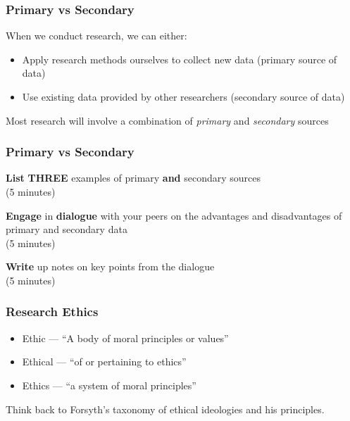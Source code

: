 \begin{frame}
	\frametitle{Primary vs Secondary}
	
	When we conduct research, we can either:
	
	\begin{itemize}
		\item Apply research methods ourselves to collect new data (primary source of data)
		\item Use existing data provided by other researchers (secondary source of data)
	\end{itemize}
	
	Most research will involve a combination of \textit{primary} and \textit{secondary} sources
	
\end{frame}

\begin{frame}
	\frametitle{Primary vs Secondary}
	
	\textbf{List} \textbf{THREE} examples of primary \textbf{and} secondary sources \\
	(5 minutes)
	
	\vspace{2em}
	
	\textbf{Engage} in \textbf{dialogue} with your peers on the advantages and disadvantages of primary and secondary data \\
	(5 minutes)
	
	\vspace{2em}
	
	\textbf{Write} up notes on key points from the dialogue \\
	(5 minutes)
\end{frame}

\begin{frame}
	\frametitle{Research Ethics}
	
	\begin{itemize}
		\item Ethic --- ``A body of moral principles or values''
		\item Ethical --- ``of or pertaining to ethics''
		\item Ethics --- ``a system of moral principles''
	\end{itemize}
	
	\vspace{2em}
	
	Think back to Forsyth's taxonomy of ethical ideologies and his principles.
	
\end{frame}

